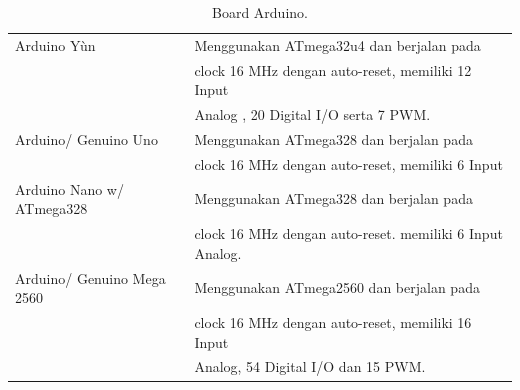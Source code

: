 \begin{table}[h!]
\centering
\begin{tabular}{ |l|l| }
\hline
Arduino Yùn & Menggunakan ATmega32u4 dan berjalan pada \\
& clock 16 MHz dengan auto-reset, memiliki 12 Input \\
& Analog , 20 Digital I/O serta 7 PWM.\\
\hline
Arduino/ Genuino Uno & Menggunakan ATmega328 dan berjalan pada \\
& clock 16 MHz dengan auto-reset, memiliki 6 Input \\
\hline
Arduino Nano w/ ATmega328 & Menggunakan ATmega328 dan berjalan pada \\
& clock 16 MHz dengan auto-reset. memiliki 6 Input Analog.\\
\hline
Arduino/ Genuino Mega 2560 & Menggunakan ATmega2560 dan berjalan pada \\
& clock 16 MHz dengan auto-reset, memiliki 16 Input \\
& Analog, 54 Digital I/O dan 15 PWM. \\






\hline
\end{tabular}
\caption{Board Arduino.}
\label{table:boardarduino}
\end{table}